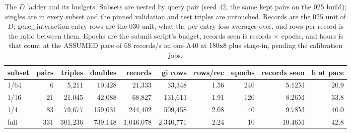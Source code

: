 
\begin{table}[htbp]
\centering\footnotesize
\caption{The $D$ ladder and its budgets. Subsets are nested by query pair (seed 42, the same kept pairs on the 025 build); singles are in every subset and the pinned validation and test triples are untouched. Records are the 025 unit of $D$; gene\_interaction entry rows are the 030 unit, what the per-entry loss averages over, and rows per record is the ratio between them. Epochs are the submit script's budget, records seen is records $\times$ epochs, and hours is that count at the ASSUMED pace of 68 records/s on one A40 at 180x8 plus stage-in, pending the calibration jobs.}
\label{tab:subsets}
\begin{tabular}{lrrrrrrrrr}
\toprule
subset & pairs & triples & doubles & records & gi rows & rows/rec & epochs & records seen & h at pace \\
\midrule
1/64 & 6 & 5,211 & 10,428 & 21,333 & 33,348 & 1.56 & 240 & 5.12M & 20.9 \\
1/16 & 21 & 21,045 & 42,088 & 68,827 & 131,613 & 1.91 & 120 & 8.26M & 33.8 \\
1/4 & 83 & 79,677 & 159,031 & 244,402 & 509,458 & 2.08 & 40 & 9.78M & 40.0 \\
full & 331 & 301,236 & 739,148 & 1,046,078 & 2,340,771 & 2.24 & 10 & 10.46M & 42.8 \\
\bottomrule
\end{tabular}
\end{table}

